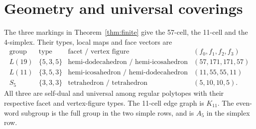 \section{Geometry and universal coverings}
\begin{theorem}\label{thm:geometry}
The three markings in Theorem~\ref{thm:finite} give the 57-cell, the
11-cell and the 4-simplex. Their types, local maps and face vectors are
\[
\begin{array}{c|c|c|c}
\text{group}&\text{type}&\text{facet / vertex figure}&(f_0,f_1,f_2,f_3)\\
L(19)&\{5,3,5\}&\text{hemi-dodecahedron / hemi-icosahedron}&(57,171,171,57)\\
L(11)&\{3,5,3\}&\text{hemi-icosahedron / hemi-dodecahedron}&(11,55,55,11)\\
S_5&\{3,3,3\}&\text{tetrahedron / tetrahedron}&(5,10,10,5).
\end{array}
\]
All three are self-dual and universal among regular polytopes with their
respective facet and vertex-figure types. The 11-cell edge graph is
$K_{11}$. The even-word subgroup is the full group in the two simple
rows, and is $A_5$ in the simplex row.
\end{theorem}
